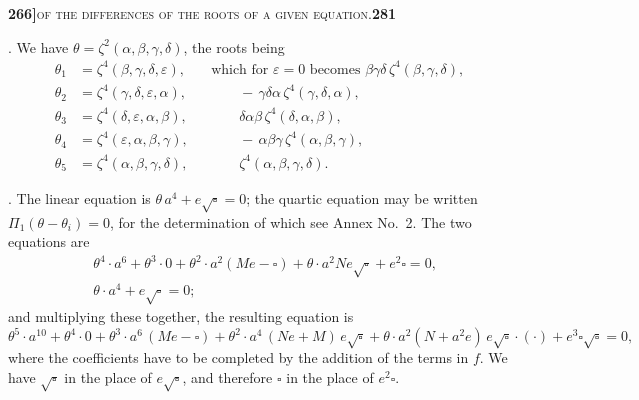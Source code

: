 \documentclass[11pt]{article}
\begin{document}
\noindent\textbf{266]}\hfill\textsc{of the differences of the roots of a given equation.}\hfill\textbf{281}

\medskip

. We have $\theta = \zeta^2(\alpha, \beta, \gamma, \delta)$, the roots being
\[
\begin{aligned}
   \theta_1 &= \zeta^4(\beta, \gamma, \delta, \varepsilon), && \text{which for $\varepsilon = 0$ becomes } \beta\gamma\delta\,\zeta^4(\beta, \gamma, \delta),\\
   \theta_2 &= \zeta^4(\gamma, \delta, \varepsilon, \alpha), && {} \qquad -\,\gamma\delta\alpha\,\zeta^4(\gamma, \delta, \alpha),\\
   \theta_3 &= \zeta^4(\delta, \varepsilon, \alpha, \beta), && {} \qquad \delta\alpha\beta\,\zeta^4(\delta, \alpha, \beta),\\
   \theta_4 &= \zeta^4(\varepsilon, \alpha, \beta, \gamma), && {} \qquad -\,\alpha\beta\gamma\,\zeta^4(\alpha, \beta, \gamma),\\
   \theta_5 &= \zeta^4(\alpha, \beta, \gamma, \delta), && {} \qquad \zeta^4(\alpha, \beta, \gamma, \delta).
\end{aligned}
\]

\medskip

. The linear equation is $\theta\,a^4 + e\sqrt{\square} = 0$; the quartic equation may be written $\Pi_1(\theta - \theta_i) = 0$, for the determination of which see Annex No.~2. The two equations are
\[
\begin{aligned}
   & \theta^4\cdot a^6 + \theta^3\cdot 0 + \theta^2\cdot a^2(M e - \square) + \theta\cdot a^2 N e \sqrt{\square} + e^2 \square = 0,\\[2pt]
   & \theta\cdot a^4 + e\sqrt{\square} = 0;
\end{aligned}
\]
and multiplying these together, the resulting equation is
\[
\theta^5\cdot a^{10} + \theta^4\cdot 0 + \theta^3\cdot a^6\,(M e - \square) + \theta^2\cdot a^4\,(N e + M)\,e\sqrt{\square} + \theta\cdot a^2(N + a^2 e)\,e\sqrt{\square}\cdot(\cdot) + e^3\square\sqrt{\square} = 0,
\]
where the coefficients have to be completed by the addition of the terms in $f$. We have $\sqrt{\square}$ in the place of $e\sqrt{\square}$, and therefore $\square$ in the place of $e^2 \square$.

\medskip
\end{document}
